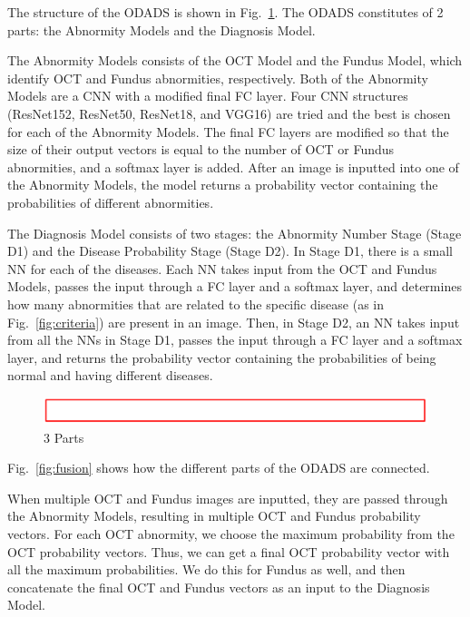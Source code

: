 \documentclass{article}
\begin{document}
		The structure of the ODADS is shown in Fig.~\ref{fig:3_parts}. The ODADS constitutes of 2 parts: the Abnormity Models and the Diagnosis Model. 
		
		The Abnormity Models consists of the OCT Model and the Fundus Model, which identify OCT and Fundus abnormities, respectively. Both of the Abnormity Models are a CNN with a modified final FC layer. Four CNN structures (ResNet152, ResNet50, ResNet18, and VGG16) are tried and the best is chosen for each of the Abnormity Models. The final FC layers are modified so that the size of their output vectors is equal to the number of OCT or Fundus abnormities, and a softmax layer is added. After an image is inputted into one of the Abnormity Models, the model returns a probability vector containing the probabilities of different abnormities.
		
		The Diagnosis Model consists of two stages: the Abnormity Number Stage (Stage D1) and the Disease Probability Stage (Stage D2). In Stage D1, there is a small NN for each of the diseases. Each NN takes input from the OCT and Fundus Models, passes the input through a FC layer and a softmax layer, and determines how many abnormities that are related to the specific disease (as in Fig.~\ref{fig:criteria}) are present in an image. Then, in Stage D2, an NN takes input from all the NNs in Stage D1, passes the input through a FC layer and a softmax layer, and returns the probability vector containing the probabilities of being normal and having different diseases.
		
		\begin{figure}[htbp]
			\centering
			\includegraphics[width=\linewidth]{Figs/Temp.png}
			\caption{3 Parts}
			\vspace{0.3cm}
			\label{fig:3_parts}
		\end{figure}
		
		Fig.~\ref{fig:fusion} shows how the different parts of the ODADS are connected.
		
		When multiple OCT and Fundus images are inputted, they are passed through the Abnormity Models, resulting in multiple OCT and Fundus probability vectors. For each OCT abnormity, we choose the maximum probability  from the OCT probability vectors. Thus, we can get a final OCT probability vector with all the maximum probabilities. We do this for Fundus as well, and then concatenate the final OCT and Fundus vectors as an input to the Diagnosis Model.
		
\end{document}
